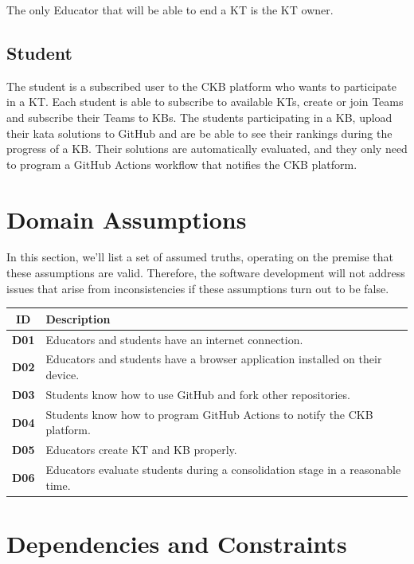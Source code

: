 \documentclass[11pt]{report}
\begin{document}
The only Educator that will be able to end a KT is the KT owner.


\subsection{Student}
The student is a subscribed user to the CKB platform who wants to participate in a KT\@.
Each student is able to subscribe to available KTs,
create or join Teams and subscribe their Teams to KBs.
The students participating in a KB, upload their kata solutions to GitHub and are
be able to see their rankings during the progress of a KB\@.
Their solutions are automatically evaluated, and they only need to program a GitHub
Actions workflow that notifies the CKB platform.


\section{Domain Assumptions} \label{domain_assumption}
In this section, we'll list a set of assumed truths, operating on the premise that these assumptions are valid.
Therefore, the software development will not address issues that arise from inconsistencies if these assumptions turn out to be false.
\begin{center}
\begin{tabular}{|c|p{12cm}|}
\hline
\rowcolor{gray!20} %
\textbf{ID} & \textbf{Description} \\ \hline
\textbf{D01} & Educators and students have an internet connection. \\
\hline
\textbf{D02} & Educators and students have a browser application installed on their device. \\
\hline
\textbf{D03} & Students know how to use GitHub and fork other repositories. \\
\hline
\textbf{D04} & Students know how to program GitHub Actions to notify the CKB platform. \\
\hline
\textbf{D05} & Educators create KT and KB properly. \\
\hline
\textbf{D06} & Educators evaluate students during a consolidation stage in a reasonable time. \\
\hline
\end{tabular}
\end{center}

\section{Dependencies and Constraints} \label{dependencies}
\end{document}
